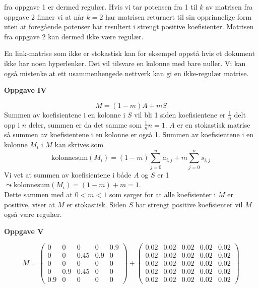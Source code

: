 \documentclass{article}%
\begin{document}
fra oppgave 1 er dermed regulær. Hvis vi tar potensen fra 1 til $k$ av matrisen fra oppgave 2 finner vi at 
når $k=2$ har matrisen returnert til sin opprinnelige form uten at foregående potenser har 
resultert i strengt positive koefisienter. Matrisen fra oppgave 2 kan dermed ikke være regulær.
\begin{tcolorbox}[halign title=center, box align=top] 
En link-matrise som ikke er stokastisk kan for eksempel oppstå hvis et dokument 
ikke har noen hyperlenker. Det vil tilsvare en kolonne med bare nuller. Vi kan også mistenke at 
ett usammenhengede nettverk kan gi en ikke-regulær matrise.
\end{tcolorbox}
\begin{tcolorbox}[colframe=white]
    \textbf{Oppgave IV}
\end{tcolorbox}
$$M = (1-m)A + mS$$
Summen av koefisientene i en kolonne i $S$ vil bli 1 siden koefisientene er $\frac{1}{n}$ delt opp i $n$
deler, summen er da det samme som $\frac{1}{n} n = 1$. $A$ er en stokastisk matrise så summen av koefisientene
i en kolonne er også 1. Summen av koefisientene i en kolonne $M_i$ i $M$ kan skrives som
$$\text{kolonnesum}(M_i) = (1-m)\sum_{j=0}^n a_{i,j} + m\sum_{j=0}^n s_{i,j} $$
Vi vet at summen av koefisientene i både $A$ og $S$ er 1 $\leadsto \text{kolonnesum}(M_i) = (1-m) + m = 1$.\\
Dette sammen med at $0<m<1$ som sørger for at alle koefisienter i $M$ er positive,
viser at $M$ er stokastisk. Siden $S$ har strengt positive koefisienter vil $M$ også være regulær.
\newpage
\begin{tcolorbox}[colframe=white]
    \textbf{Oppgave V}
\end{tcolorbox}
$$M=
\begin{pmatrix}
    0 &   0   &   0             &   0   &   0.9\\
    0 &   0   &   0.45   &   0.9   &   0\\
    0 &   0   &   0             &   0   &   0\\
    0 &   0.9   &   0.45   &   0   &   0\\
    0.9 &   0   &   0             &   0   &   0
\end{pmatrix}+
\begin{pmatrix}
    0.02 &   0.02   &   0.02   &   0.02   &   0.02\\
    0.02 &   0.02   &   0.02   &   0.02   &   0.02\\
    0.02 &   0.02   &   0.02   &   0.02   &   0.02\\
    0.02 &   0.02   &   0.02   &   0.02   &   0.02\\
    0.02 &   0.02   &   0.02   &   0.02   &   0.02
\end{pmatrix}$$
\end{document}
